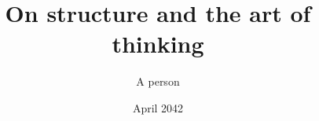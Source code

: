 \documentclass[11pt,a4paper]{report}
\begin{document}
\title{On structure and the art of thinking}
\author{A person}
\date{April 2042}
\maketitle
\end{document}
